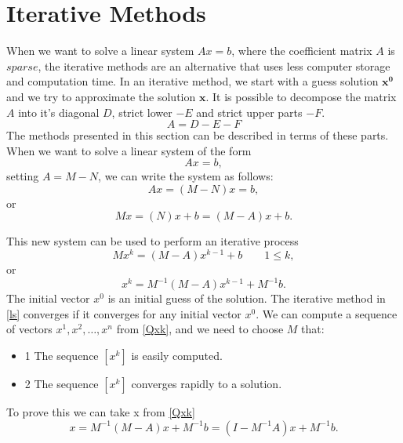 \documentclass[a4paper,10pt]{report}
\begin{document}
\section{Iterative Methods}
When we want to solve a linear system $Ax=b$, where the coefficient matrix $A$ is $sparse$,
the iterative methods are an alternative that uses less computer storage and computation time.
In an iterative method, we start with a guess solution $\mathbf{x^0}$ and we try to approximate
the solution $\mathbf{x}$.
It is possible to decompose the matrix $A$ into it's diagonal $D$, strict lower $-E$ and strict
upper parts $-F$. 
$$A=D-E-F$$
The methods presented in this section can be described in terms of these parts.
When we want to solve a linear system of the form $$Ax=b,$$ setting $A=M-N$, we can write the system as follows:
\begin{equation*}
Ax=(M-N)x=b,
\end{equation*}
or
\begin{equation*}
Mx=(N)x+b=(M-A)x+b.
\end{equation*}

This new system can be used to perform an iterative process
\begin{equation*}
Mx^{k}=(M-A)x^{k-1}+b \qquad 1\leq k, 
\end{equation*}
or
\begin{equation}
 x^{k}=M^{-1}(M-A)x^{k-1}+M^{-1}b. \label{Qxk}
\end{equation}
The initial vector $x^{0}$ is an initial guess of the solution. The iterative method in \eqref{ls}
converges if it converges for any initial vector $x^{0}$. We can compute a sequence of vectors $x^{1},x^{2},\dots,x^{n}$  
 from \eqref{Qxk}, and we need to choose $M$ that:
\begin{itemize}
\item{1} The sequence $[x^{k}]$ is easily computed.
\item{2} The sequence $[x^{k}]$ converges rapidly to a solution.
\end{itemize}
To prove this we can take x from \eqref{Qxk}
\begin{equation*}
x=M^{-1}(M-A)x+M^{-1}b=(I-M^{-1}A)x+M^{-1}b.
\end{equation*}
\end{document}
